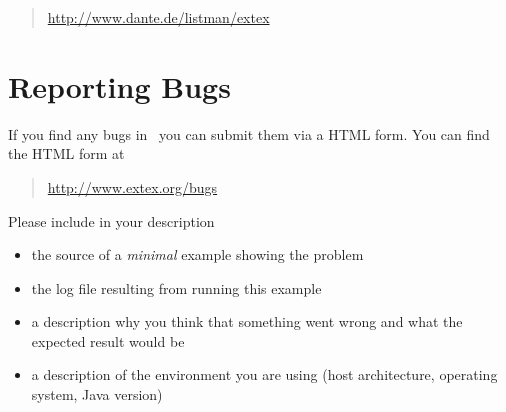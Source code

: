 \begin{quotation}
  \url{http://www.dante.de/listman/extex}
\end{quotation}


\section{Reporting Bugs}


If you find any bugs in \ExBib\ you can submit them 
via a HTML form.
You can find the HTML form at
\begin{quotation}
  \url{http://www.extex.org/bugs}
\end{quotation}

Please include in your description 
\begin{itemize}
\item the source of a \emph{minimal} example showing the problem
\item the log file resulting from running this example
\item a description why you think that something went wrong and what
  the expected result would be
\item a description of the environment you are using (host
  architecture, operating system, Java version)
\end{itemize}

\endinput
%
